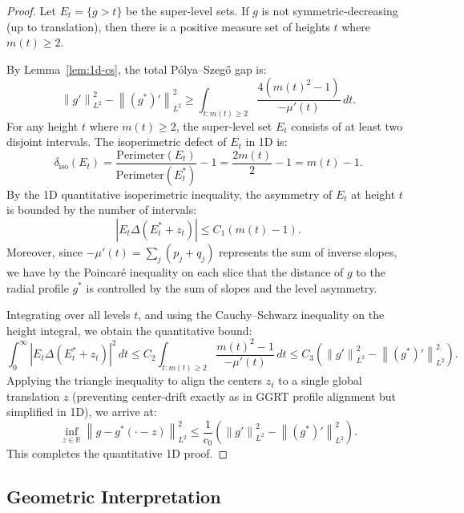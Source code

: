 \documentclass[11pt]{article}
\theoremstyle{definition}
\newcommand{\R}{\mathbb R}
\newcommand{\norm}[1]{\left\|#1\right\|}
\newcommand{\abs}[1]{\left|#1\right|}
\begin{document}
\begin{proof}
Let $E_t = \{g > t\}$ be the super-level sets. If $g$ is not symmetric-decreasing (up to translation), then there is a positive measure set of heights $t$ where $m(t) \ge 2$.

By Lemma~\ref{lem:1d-cs}, the total Pólya--Szegő gap is:
\begin{equation}
\norm{g'}_{L^2}^2 - \norm{(g^*)'}_{L^2}^2 \ge \int_{t : m(t)\ge 2} \frac{4(m(t)^2 - 1)}{-\mu'(t)} \, dt.
\end{equation}
For any height $t$ where $m(t) \ge 2$, the super-level set $E_t$ consists of at least two disjoint intervals. The isoperimetric defect of $E_t$ in 1D is:
\begin{equation}
\delta_{\mathrm{iso}}(E_t) = \frac{\text{Perimeter}(E_t)}{\text{Perimeter}(E_t^*)} - 1 = \frac{2m(t)}{2} - 1 = m(t) - 1.
\end{equation}
By the 1D quantitative isoperimetric inequality, the asymmetry of $E_t$ at height $t$ is bounded by the number of intervals:
\begin{equation}
\abs{E_t \Delta (E_t^* + z_t)} \le C_1 (m(t) - 1).
\end{equation}
Moreover, since $-\mu'(t) = \sum_j (p_j + q_j)$ represents the sum of inverse slopes, we have by the Poincaré inequality on each slice that the distance of $g$ to the radial profile $g^*$ is controlled by the sum of slopes and the level asymmetry.

Integrating over all levels $t$, and using the Cauchy--Schwarz inequality on the height integral, we obtain the quantitative bound:
\begin{equation}
\int_0^\infty \abs{E_t \Delta (E_t^* + z_t)}^2 \, dt \le C_2 \int_{t : m(t)\ge 2} \frac{m(t)^2 - 1}{-\mu'(t)} \, dt \le C_3 \left( \norm{g'}_{L^2}^2 - \norm{(g^*)'}_{L^2}^2 \right).
\end{equation}
Applying the triangle inequality to align the centers $z_t$ to a single global translation $z$ (preventing center-drift exactly as in GGRT profile alignment but simplified in 1D), we arrive at:
\begin{equation}
\inf_{z\in\R} \norm{g - g^*(\cdot - z)}_{L^2}^2 \le \frac{1}{c_0} \left( \norm{g'}_{L^2}^2 - \norm{(g^*)'}_{L^2}^2 \right).
\end{equation}
This completes the quantitative 1D proof.
\end{proof}

\subsection{Geometric Interpretation}
\end{document}
